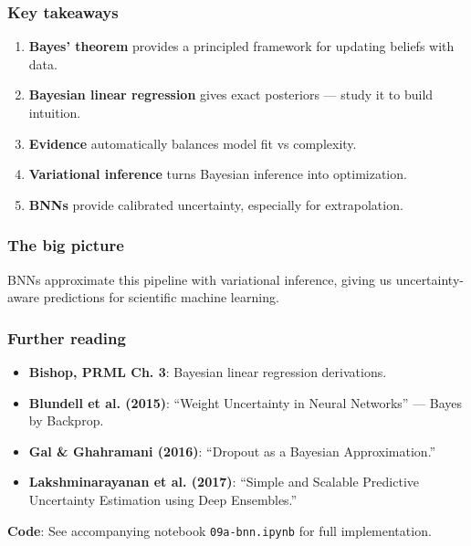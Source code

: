 \documentclass{beamer}
\begin{document}
\begin{frame}
\frametitle{Key takeaways}
\begin{enumerate}
    \item \textbf{Bayes' theorem} provides a principled framework for updating beliefs with data.
    \item \textbf{Bayesian linear regression} gives exact posteriors --- study it to build intuition.
    \item \textbf{Evidence} automatically balances model fit vs complexity.
    \item \textbf{Variational inference} turns Bayesian inference into optimization.
    \item \textbf{BNNs} provide calibrated uncertainty, especially for extrapolation.
\end{enumerate}
\end{frame}

\begin{frame}
\frametitle{The big picture}
\begin{center}
\end{center}
\vspace{0.3cm}
BNNs approximate this pipeline with variational inference, giving us uncertainty-aware predictions for scientific machine learning.
\end{frame}

\begin{frame}
\frametitle{Further reading}
\begin{itemize}
    \item \textbf{Bishop, PRML Ch. 3}: Bayesian linear regression derivations.
    \item \textbf{Blundell et al. (2015)}: ``Weight Uncertainty in Neural Networks'' --- Bayes by Backprop.
    \item \textbf{Gal \& Ghahramani (2016)}: ``Dropout as a Bayesian Approximation.''
    \item \textbf{Lakshminarayanan et al. (2017)}: ``Simple and Scalable Predictive Uncertainty Estimation using Deep Ensembles.''
\end{itemize}
\vspace{0.3cm}
\textbf{Code}: See accompanying notebook \texttt{09a-bnn.ipynb} for full implementation.
\end{frame}
\end{document}
